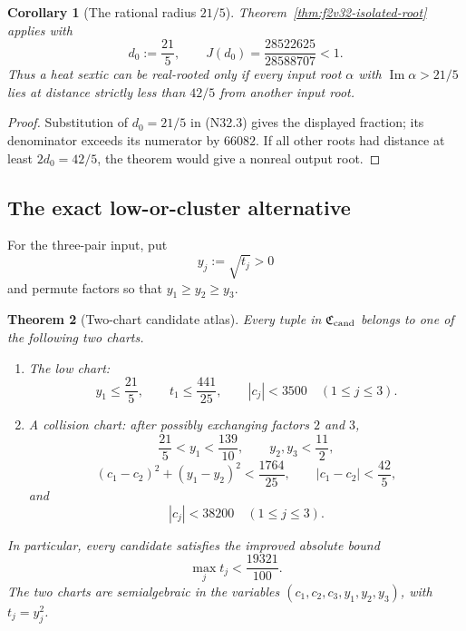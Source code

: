 \documentclass[11pt]{article}
\newtheorem{theorem}{Theorem}[section]
\newtheorem{corollary}[theorem]{Corollary}
\theoremstyle{definition}
\theoremstyle{remark}
\begin{document}
\begin{corollary}[The rational radius \(21/5\)]
\label{cor:f2v32-radius}
Theorem~\ref{thm:f2v32-isolated-root} applies with
\[
 d_0:=\frac{21}{5},
 \qquad
 J(d_0)
 =\frac{28522625}{28588707}<1.
 \tag{N32.8}
\]
Thus a heat sextic can be real-rooted only if every input root
\(\alpha\) with \(\operatorname{Im}\alpha>21/5\) lies at distance
strictly less than \(42/5\) from another input root.
\end{corollary}

\begin{proof}
Substitution of \(d_0=21/5\) in \textup{(N32.3)} gives the displayed
fraction; its denominator exceeds its numerator by \(66082\).  If all
other roots had distance at least \(2d_0=42/5\), the theorem would give
a nonreal output root.
\end{proof}

\subsection{The exact low-or-cluster alternative}

For the three-pair input, put
\[
 y_j:=\sqrt{t_j}>0
 \tag{N32.9}
\]
and permute factors so that
\(y_1\geq y_2\geq y_3\).

\begin{theorem}[Two-chart candidate atlas]
\label{thm:f2v32-two-chart}
Every tuple in \(\mathfrak C_{\rm cand}\) belongs to one of the following
two charts.

\begin{enumerate}[label=\textup{(\roman*)}]
\item The low chart:
\[
 y_1\leq\frac{21}{5},\qquad
 t_1\leq\frac{441}{25},\qquad
 |c_j|<3500\quad(1\leq j\leq3).
 \tag{N32.10}
\]

\item A collision chart: after possibly exchanging factors \(2\) and \(3\),
\[
 \frac{21}{5}<y_1<\frac{139}{10},\qquad
 y_2,y_3<\frac{11}{2},
 \tag{N32.11}
\]
\[
 (c_1-c_2)^2+(y_1-y_2)^2<\frac{1764}{25},
 \qquad |c_1-c_2|<\frac{42}{5},
 \tag{N32.12}
\]
and
\[
 |c_j|<38200\quad(1\leq j\leq3).
 \tag{N32.13}
\]
\end{enumerate}
In particular, every candidate satisfies the improved absolute bound
\[
 \boxed{\max_jt_j<\frac{19321}{100}.}
 \tag{N32.14}
\]
The two charts are semialgebraic in the variables
\((c_1,c_2,c_3,y_1,y_2,y_3)\), with \(t_j=y_j^2\).
\end{theorem}
\end{document}

